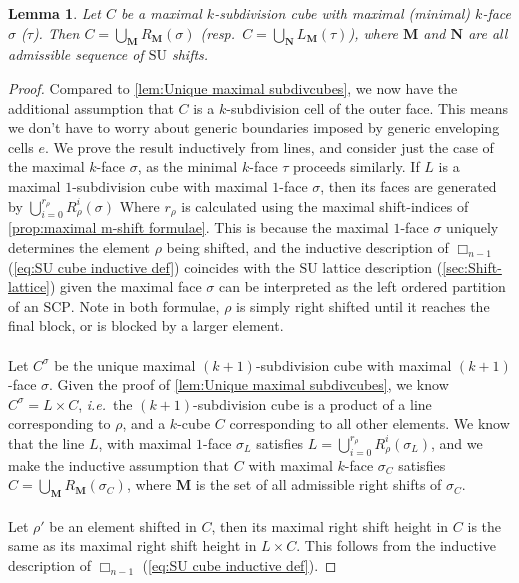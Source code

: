 \documentclass{amsart}
\newtheorem{lemma}[theorem]{Lemma}
\theoremstyle{definition}
\newcommand{\ie}{\textit{i.e.}~} %
\newcommand{\resp}{\textit{resp.}~} %
\newcommand{\SU}{\mathrm{SU}}
\newcommand{\SCP}{\mathrm{SCP}}
\newcommand{\divcube}[1]{\Box_{#1}}
\begin{document}
\begin{lemma}
Let $C$ be a maximal $k$-subdivision cube with  maximal (minimal) $k$-face $\sigma$ ($\tau$).
Then $C = \bigcup_{\mathbf{M}} R_\mathbf{M}(\sigma)$ (\resp $C=\bigcup_{\mathbf{N}} L_\mathbf{M}(\tau)$), where $\mathbf{M}$ and $\mathbf{N}$ are all admissible sequence of $\SU$ shifts.

\end{lemma}
\begin{proof}
Compared to \cref{lem:Unique maximal subdivcubes}, we now have the additional assumption that $C$ is a $k$-subdivision cell of the outer face.
This means we don't have to worry about generic boundaries imposed by generic enveloping cells $e$.
We prove the result inductively from lines, and consider just the case of the maximal $k$-face $\sigma$, as the minimal $k$-face $\tau$ proceeds similarly.
If $L$ is a maximal $1$-subdivision cube with maximal $1$-face $\sigma$, then its faces are generated by $\bigcup_{i=0}^{r_\rho} R_\rho^i(\sigma)$
Where $r_\rho$ is calculated using the maximal shift-indices of \cref{prop:maximal m-shift formulae}.
This is because the maximal $1$-face $\sigma$ uniquely determines the element $\rho$ being shifted, and the inductive description of $\divcube{n-1}$ (\cref{eq:SU cube inductive def}) coincides with the $\SU$ lattice description (\cref{sec:Shift-lattice}) given the maximal face $\sigma$ can be interpreted as the left ordered partition of an $\SCP$.
Note in both formulae, $\rho$ is simply right shifted until it reaches the final block, or is blocked by a larger element.
\\\\
Let $C^\sigma$ be the unique maximal $(k+1)$-subdivision cube with maximal $(k+1)$-face $\sigma$.
Given the proof of \cref{lem:Unique maximal subdivcubes}, we know $C^\sigma = L\times C$, \ie the $(k+1)$-subdivision cube is a product of a line corresponding to $\rho$, and a $k$-cube $C$ corresponding to all other elements.
We know that the line $L$, with maximal $1$-face $\sigma_L$ satisfies $L=\bigcup_{i=0}^{r_\rho} R_\rho^i(\sigma_L)$, and we make the inductive assumption that $C$ with maximal $k$-face $\sigma_C$ satisfies $C = \bigcup_{\mathbf{M}}R_\mathbf{M}(\sigma_C)$, where $\mathbf{M}$ is the set of all admissible right shifts of $\sigma_C$.
\\\\
Let $\rho'$ be an element shifted in $C$, then its maximal right shift height in $C$ is the same as its maximal right shift height in $L\times C$.
This follows from the inductive description of $\divcube{n-1}$ (\cref{eq:SU cube inductive def}).

\end{proof}
\end{document}
